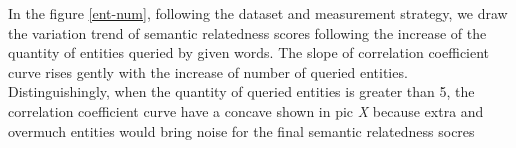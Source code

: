 In the figure \ref{ent-num}, following the dataset and measurement strategy, we draw the variation trend
of semantic relatedness scores following the increase of the quantity of entities queried by given words.
The slope of correlation coefficient curve rises gently with the increase of number of queried entities.
Distinguishingly, when the quantity of queried entities is greater than 5, the correlation coefficient
curve have a concave shown in pic \emph{X} because extra and overmuch entities would bring noise for the final
semantic relatedness socres

\begin{table}[H]
    \centering
    \caption{Spearman correlation performance on five word similarity and relatedness datasets}
    \label{spearman}
    \renewcommand\arraystretch{1.15}
\end{table}

